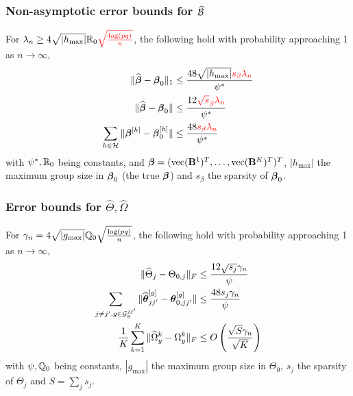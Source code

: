 \documentclass[10pt]{beamer}
\theoremstyle{definition}
\DeclareMathOperator*{\ve}{vec}
\DeclareMathOperator*{\supp}{\text{supp}}
\begin{document}

\begin{frame}
\frametitle{Non-asymptotic error bounds for $\widehat {{\cal{B}}}$}

For $\lambda_n \geq 4 \sqrt{| h_{\max} |} {\mathbb{R}}_0 {\color{red} \sqrt{ \frac{ \log(pq)}{n}}}$, the following hold with probability approaching 1 as $n \rightarrow \infty$,
%
\begin{align*}
\| \widehat {{\boldsymbol{\beta}}} - {\boldsymbol{\beta}}_0 \|_1 & \leq \frac{48 \sqrt{ | h_{\max} |} {\color{red} s_\beta \lambda_n}}{ \psi^*} \\
\| \widehat {{\boldsymbol{\beta}}} - {\boldsymbol{\beta}}_0 \| & \leq \frac{12 {\color{red} \sqrt s_\beta \lambda_n}}{ \psi^*} \\
\sum_{h \in {\cal{H}}} \| {\boldsymbol{\beta}}^{[h]} - {\boldsymbol{\beta}}_0^{[h]} \| & \leq \frac{48 {\color{red} s_\beta \lambda_n}}{ \psi^*}
\end{align*}
%
with $\psi^*, {\mathbb{R}}_0$ being constants, and $\bfbeta = (\ve(\bfB^1)^T, \ldots, \ve(\bfB^K)^T)^T$, $| h_{\max} |$ the maximum group size in ${\boldsymbol{\beta}}_0$ (the true ${\boldsymbol{\beta}}$) and $s_\beta$ the sparsity of ${\boldsymbol{\beta}}_0$.
\end{frame}


\begin{frame}
\frametitle{Error bounds for $\widehat \Theta, \widehat\Omega$}

For $\gamma_n = 4 \sqrt{| g_{\max}|} {\mathbb{Q}}_0 \sqrt{ \frac{ \log(pq)}{n}}$, the following hold with probability approaching 1 as $n \rightarrow \infty$,
%
\begin{align*}
\| \widehat \Theta_j - \Theta_{0,j} \|_F & \leq \frac{12 \sqrt{s_j} \gamma_n}{\psi} \\
\sum_{j \neq j', g \in {\cal{G}}_y^{jj'}} \| \widehat {{\boldsymbol{\theta}}}_{jj'}^{[g]} - {\boldsymbol{\theta}}_{0,jj'}^{[g]} \| & \leq \frac{48 s_j \gamma_n}{\psi} \\
\frac{1}{K} \sum_{k=1}^K \| \widehat \Omega_y^k - \Omega_y^k \|_F & \leq
O \left( \frac{\sqrt S \gamma_n }{\sqrt K} \right)\\
\end{align*}
%
with $\psi, {\mathbb{Q}}_0$ being constants, $| g_{\max} |$ the maximum group size in $\Theta_0$, $s_j$ the sparsity of $\Theta_j$ and $S = \sum_j s_j$.
\end{frame}

\end{document}
